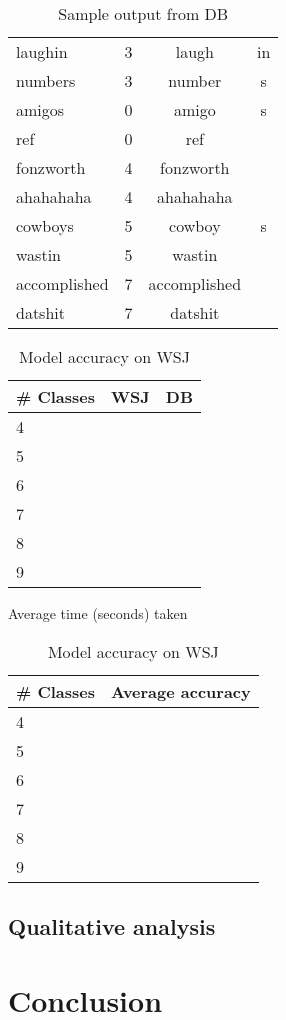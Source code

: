 \documentclass{article}
\begin{document}
\begin{table*}[ht]
\begin{minipage}[b]{0.5\linewidth}
\begin{tabular}{lccc}
laughin & 3 & laugh & in \\
numbers & 3 & number & s \\
amigos & 0 & amigo & s \\ 
ref & 0 & ref & \\
fonzworth & 4 & fonzworth & \\
ahahahaha & 4 & ahahahaha & \\
cowboys & 5 & cowboy & s \\
wastin & 5 & wastin & \\
accomplished & 7 & accomplished & \\
datshit & 7 & datshit & \\
\hline
 \end{tabular}
\caption{\label{outputDB} Sample output from DB}
\end{minipage}
\end{table*}

\begin{table}[ht]
\begin{minipage}[b]{0.5\linewidth}\centering
 \begin{tabular}{lcc}
  \hline
  \# Classes & WSJ & DB \\
  \hline
  4 & & \\
  5 & & \\
  6 & & \\
  7 & & \\
  8 & & \\
  9 & & \\
  \hline
 \end{tabular}
\caption{\label{timeTable}Average time (seconds) taken}
\end{minipage}
\begin{minipage}[b]{0.5\linewidth}\centering
 \begin{tabular}{lc}
  \hline
  \# Classes & Average accuracy \\
  \hline
  4 & \\
  5 & \\
  6 & \\
  7 & \\
  8 & \\
  9 & \\
  \hline
 \end{tabular}
\caption{\label{accuTable}Model accuracy on WSJ}
\end{minipage}
\end{table}

\subsection{Qualitative analysis}

\section{Conclusion}
\label{sec:conclusion}



\end{document}
